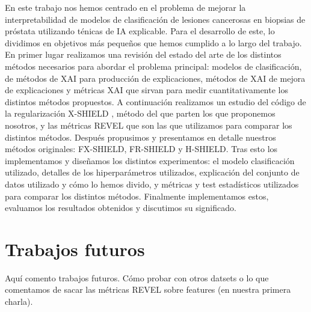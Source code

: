 En este trabajo nos hemos centrado en el problema de mejorar la interpretabilidad de modelos de clasificación de lesiones cancerosas en biopsias de próstata utilizando ténicas de IA explicable. Para el desarrollo de este, lo dividimos en objetivos más pequeños que hemos cumplido a lo largo del trabajo. En primer lugar realizamos una revisión del estado del arte de los distintos métodos necesarios para abordar el problema principal: modelos de clasificación, de métodos de XAI para producción de explicaciones, métodos de XAI de mejora de explicaciones y métricas XAI que sirvan para medir cuantitativamente los distintos métodos propuestos. A continuación realizamos un estudio del código de la regularización X-SHIELD \cite{XSHIELD}, método del que parten los que proponemos nosotros, y las métricas REVEL \cite{REVEL} que son las que utilizamos para comparar los distintos métodos. Después propusimos y presentamos en detalle nuestros métodos originales: FX-SHIELD, FR-SHIELD y H-SHIELD. Tras esto los implementamos y diseñamos los distintos experimentos: el modelo clasificación utilizado, detalles de los hiperparámetros utilizados, explicación del conjunto de datos utilizado y cómo lo hemos divido, y métricas y test estadísticos utilizados para comparar los distintos métodos. Finalmente implementamos estos, evaluamos los resultados obtenidos y discutimos su significado.





\section{Trabajos futuros}

Aquí comento trabajos futuros. Cómo probar con otros datsets o lo que comentamos de sacar las métricas REVEL sobre features (en nuestra primera charla).


